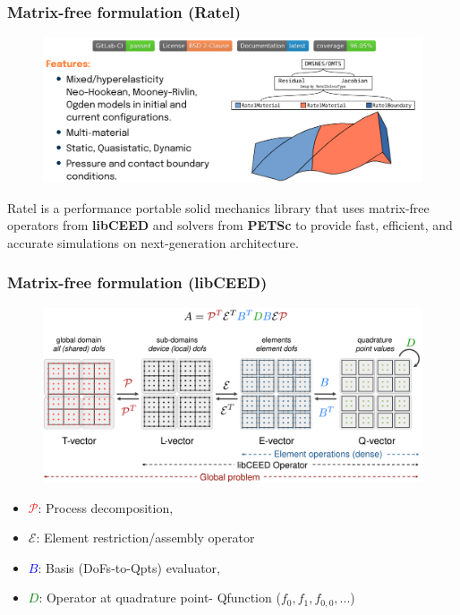 \documentclass{beamer}
\begin{document}
\begin{frame}
	\frametitle{Matrix-free formulation (Ratel)}
	\begin{figure} [h]
		\includegraphics[width=\textwidth]{../figs/ratel.png}
	\end{figure}

	
	\begin{tcolorbox}
		Ratel is a performance portable solid mechanics library that uses matrix-free operators from \textbf{libCEED} and solvers from \textbf{PETSc} to provide fast, efficient, and accurate
		simulations on next-generation architecture.
	\end{tcolorbox}

\end{frame}

\begin{frame}
	\frametitle{Matrix-free formulation (libCEED)}
	\begin{figure} [h]
		\includegraphics[width=\textwidth]{../figs/libCEEDAPI.pdf}
	\end{figure}
	\begin{itemize}
		\item \textcolor{red}{$\mathcal P$}: Process decomposition,
		\item $\mathcal E$: Element restriction/assembly operator
		\item \textcolor{blue}{$B$}: Basis (DoFs-to-Qpts) evaluator, 
		\item \textcolor{green}{$D$}: Operator at quadrature point- Qfunction ($f_0, f_1, f_{0,0},...$)
	\end{itemize}
\end{frame}
\end{document}
